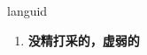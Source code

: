 
\begin{frame}
{\huge languid}
\begin{center}
\begin{enumerate}\Large
  \item \textbf{没精打采的，虚弱的}
\end{enumerate}
\end{center}
\end{frame}
